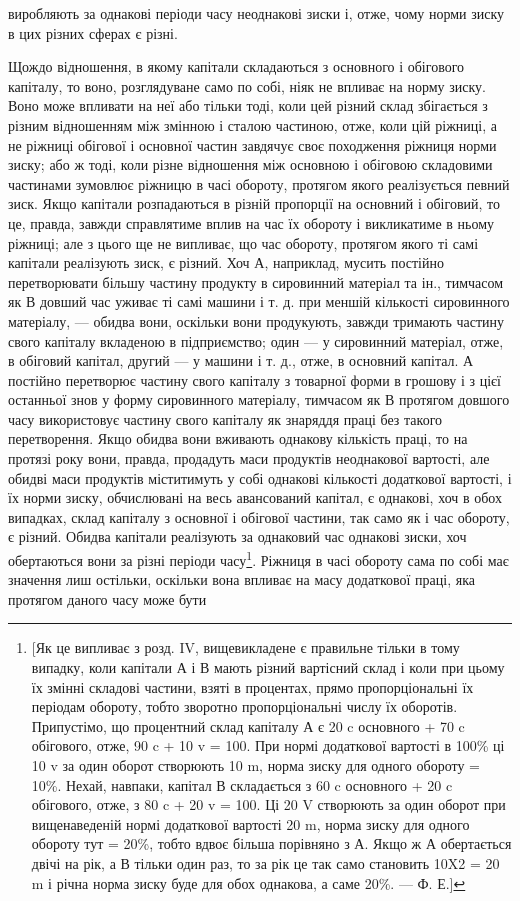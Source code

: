 виробляють за однакові періоди часу неоднакові зиски і, отже,
чому норми зиску в цих різних сферах є різні.

Щождо відношення, в якому капітали складаються з основного і обігового капіталу, то воно,
розглядуване само по собі, ніяк не впливає на норму зиску. Воно може впливати на неї або тільки
тоді, коли цей різний склад збігається з різним відношенням між змінною і сталою частиною, отже,
коли цій ріжниці, а не ріжниці обігової і основної частин завдячує своє походження ріжниця норми
зиску; або ж тоді, коли різне відношення між основною і обіговою складовими частинами зумовлює
ріжницю в часі обороту, протягом якого реалізується певний зиск. Якщо капітали розпадаються в різній
пропорції на основний і обіговий, то це, правда, завжди справлятиме вплив
на час їх обороту і викликатиме в ньому ріжниці; але з цього
ще не випливає, що час обороту, протягом якого ті самі капітали реалізують зиск, є різний. Хоч А,
наприклад, мусить постійно перетворювати більшу частину продукту в сировинний матеріал та ін.,
тимчасом як В довший час уживає ті самі
машини і т. д. при меншій кількості сировинного матеріалу, — обидва вони, оскільки вони продукують,
завжди тримають
частину свого капіталу вкладеною в підприємство; один — у сировинний матеріал, отже, в обіговий
капітал, другий — у машини
і т. д., отже, в основний капітал. А постійно перетворює частину свого капіталу з товарної форми в
грошову і з цієї останньої знов у форму сировинного матеріалу, тимчасом як В протягом довшого часу
використовує частину свого капіталу як
знаряддя праці без такого перетворення. Якщо обидва вони
вживають однакову кількість праці, то на протязі року вони,
правда, продадуть маси продуктів неоднакової вартості, але
обидві маси продуктів міститимуть у собі однакові кількості
додаткової вартості, і їх норми зиску, обчислювані на весь авансований капітал, є однакові, хоч в
обох випадках, склад капіталу з
основної і обігової частини, так само як і час обороту, є різний.
Обидва капітали реалізують за однаковий час однакові зиски, хоч
обертаються вони за різні періоди часу\footnote{
[Як це випливає з розд. IV, вищевикладене є правильне тільки в тому
випадку, коли капітали А і В мають різний вартісний склад і коли при цьому
їх змінні складові частини, взяті в процентах, прямо пропорціональні їх періодам обороту, тобто
зворотно пропорціональні числу їх оборотів. Припустімо,
що процентний склад капіталу А є 20 c основного + 70 c обігового, отже,
90 c + 10 v = 100. При нормі додаткової вартості в 100\% ці 10 v за один оборот створюють 10 m, норма
зиску для одного обороту = 10\%. Нехай, навпаки, капітал В складається з 60 c основного + 20 c
обігового, отже, з 80 c + 20 v = 100.
Ці 20 V створюють за один оборот при вищенаведеній нормі додаткової вартості 20 m, норма зиску для
одного обороту тут = 20\%, тобто вдвоє більша
порівняно з А. Якщо ж А обертається двічі на рік, а В тільки один раз, то за
рік це так само становить 10X2 = 20 m і річна норма зиску буде для обох
однакова, а саме 20\%. — Ф. Е.]
}. Ріжниця в часі обороту
сама по собі має значення лиш остільки, оскільки вона впливає
на масу додаткової праці, яка протягом даного часу може бути